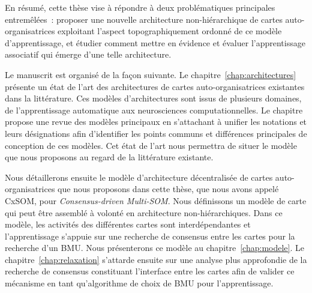 En résumé, cette thèse vise à répondre à deux problématiques principales entremêlées~: proposer une nouvelle architecture non-hiérarchique de cartes auto-organisatrices exploitant l'aspect topographiquement ordonné de ce modèle d'apprentissage, et étudier comment mettre en évidence et évaluer l'apprentissage associatif qui émerge d'une telle architecture.

Le manuscrit est organisé de la façon suivante.
Le chapitre~\ref{chap:architectures} présente un état de l'art des architectures de cartes auto-organisatrices existantes dans la littérature. Ces modèles d'architectures sont issus de plusieurs domaines, de l'apprentissage automatique aux neurosciences computationnelles.
Le chapitre propose une revue des modèles principaux en s'attachant à unifier les notations et leurs désignations afin d'identifier les points communs et différences principales de conception de ces modèles.
Cet état de l'art nous permettra de situer le modèle que nous proposons au regard de la littérature existante.

Nous détaillerons ensuite le modèle d'architecture décentralisée de cartes auto-organisatrices que nous proposons dans cette thèse, que nous avons appelé CxSOM, pour \emph{Consensus-driven Multi-SOM}. 
Nous définissons un modèle de carte qui peut être assemblé à volonté en architecture non-hiérarchiques.
Dans ce modèle, les activités des différentes cartes sont interdépendantes et l'apprentissage s'appuie sur une recherche de consensus entre les cartes pour la recherche d'un BMU.
Nous présenterons ce modèle au chapitre~\ref{chap:modele}. Le chapitre~\ref{chap:relaxation} s'attarde ensuite sur une analyse plus approfondie de la recherche de consensus constituant l'interface entre les cartes afin de valider ce mécanisme en tant qu'algorithme de choix de BMU pour l'apprentissage.

